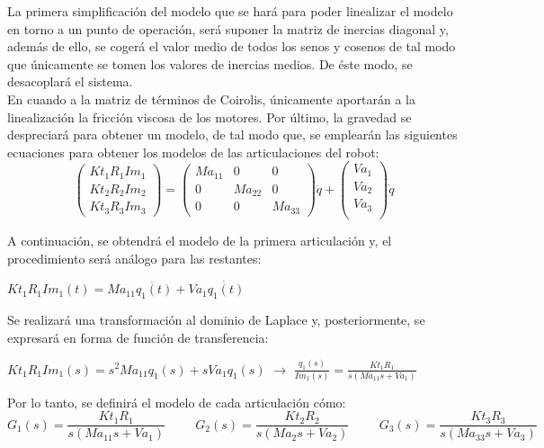 La primera simplificación del modelo que se hará para poder linealizar el modelo en torno a un punto de operación, será suponer la matriz de inercias diagonal y, además de ello, se cogerá el valor medio de todos los senos y cosenos de tal modo que únicamente se tomen los valores de inercias medios. De éste modo, se desacoplará el sistema.\\
En cuando a la matriz de términos de Coirolis, únicamente aportarán a la linealización la fricción viscosa de los motores. Por último, la gravedad se despreciará para obtener un modelo, de tal modo que, se emplearán las siguientes ecuaciones para obtener los modelos de las articulaciones del robot:
\begin{equation}
	\begin{pmatrix}
	Kt_{1}R_{1}Im_{1}  \\
	Kt_{2}R_{2}Im_{2}  \\
	Kt_{3}R_{3}Im_{3}
	\end{pmatrix} =
	\begin{pmatrix}
	Ma_{11} & 0 	  & 0  \\
		0   & Ma_{22} & 0  \\
		0   & 0   	  & Ma_{33}
	\end{pmatrix}
	\ddot{q}+
	\begin{pmatrix}
	Va_{1} \\
	Va_{2} \\
	Va_{3} \\
	\end{pmatrix}
	\dot{q}
\end{equation}

A continuación, se obtendrá el modelo de la primera articulación y, el procedimiento será análogo para las restantes:
\begin{center}
	$Kt_{1}R_{1}Im_{1}(t)=Ma_{11}\ddot{q_{1}(t)} + Va_{1}\dot{q_{1}(t)}$
\end{center}
Se realizará una transformación al dominio de Laplace y, posteriormente, se expresará en forma de función de transferencia:
\begin{center}
	$Kt_{1}R_{1}Im_{1}(s)=s^{2}Ma_{11}q_{1}(s) + sVa_{1}q_{1}(s)$ $\rightarrow$ $\frac{q_{1}(s)}{Im_{1}(s)}=\frac{Kt_{1}R_{1}}{s(Ma_{11}s+Va_{1})}$
\end{center}

Por lo tanto, se definirá el modelo de cada articulación cómo:
\begin{equation}
	G_{1}(s)=\frac{Kt_{1}R_{1}}{s(Ma_{11}s+Va_{1})} \hspace{1cm} G_{2}(s)=\frac{Kt_{2}R_{2}}{s(Ma_{2}s+Va_{2})} \hspace{1cm} G_{3}(s)=\frac{Kt_{3}R_{3}}{s(Ma_{33}s+Va_{3})}
\end{equation}
\newpage
